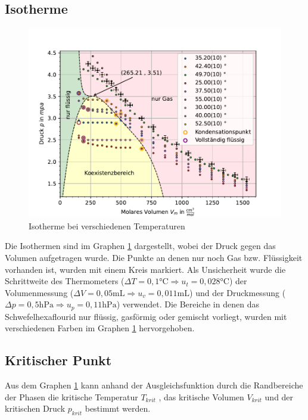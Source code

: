 \documentclass[11pt, a4paper]{article}
\begin{document}
    \subsection{Isotherme}
    \begin{figure}
        \centering
        \includegraphics[width=\textwidth]{./Plots/4Plot_of_Hell.pdf}

        \caption{Isotherme bei verschiedenen Temperaturen}
        \label{fig:isotherme}
    \end{figure}
    Die Isothermen sind im Graphen \ref{fig:isotherme} dargestellt, wobei der Druck gegen das Volumen aufgetragen wurde.
    Die Punkte an denen nur noch Gas bzw. Flüssigkeit vorhanden ist, wurden mit einem Kreis markiert. Als
    Unsicherheit wurde die Schrittweite des Thermometers ($\Delta T = 0,1 \si{\celsius} \Rightarrow u_t = 0,028 \si{\celsius}$)
    der Volumenmessung ($\Delta V = 0,05 \si{\milli\liter} \Rightarrow u_v = 0,011 \si{\milli\liter}$) und der Druckmessung
    ($\Delta p = 0,5 \si{\hecto\pascal} \Rightarrow u_p = 0,11 \si{\hecto\pascal}$) verwendet.
    Die Bereiche in denen das Schwefelhexaflourid nur flüssig, gasförmig oder gemischt vorliegt, wurden mit verschiedenen
    Farben im Graphen \ref{fig:isotherme} hervorgehoben.

    \subsection{Kritischer Punkt}

    Aus dem Graphen \ref{fig:isotherme} kann anhand der Ausgleichsfunktion durch die Randbereiche der Phasen
    die kritische Temperatur $T_{krit}$ , das kritische Volumen $V_{krit}$ und der kritischen Druck $p_{krit}$ bestimmt werden.
    
\end{document}
